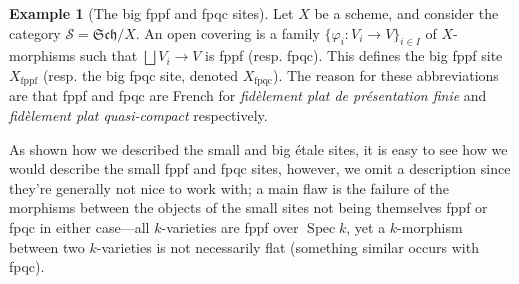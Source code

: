 \documentclass[oneside]{amsart}
\theoremstyle{definition}
\DeclareMathOperator{\spec}{Spec}
\newtheorem{ex}{Example}[section]
\begin{document}
\begin{ex}[The big fppf and fpqc sites] Let $X$ be a scheme, and consider the category $\mathcal S = \mathfrak{Sch}/X$. An open covering is a family $\{ \varphi_i \colon V_i \to V \}_{i \in I}$ of $X$-morphisms such that $\bigsqcup V_i \to V$ is fppf (resp. fpqc). This defines the big fppf site $X_{\text{fppf}}$ (resp. the big fpqc site, denoted $X_{\text{fpqc}}$). The reason for these abbreviations are that fppf and fpqc are French for \textit{fid\`element plat de pr\'esentation finie} and \textit{fid\`element plat quasi-compact} respectively.

As shown how we described the small and big \'etale sites, it is easy to see how we would describe the small fppf and fpqc sites, however, we omit a description since they're generally not nice to work with; a main flaw is the failure of the morphisms between the objects of the small sites not being themselves fppf or fpqc in either case---all $k$-varieties are fppf over $\spec k$, yet a $k$-morphism between two $k$-varieties is not necessarily flat (something similar occurs with fpqc).
\end{ex}
\end{document}
